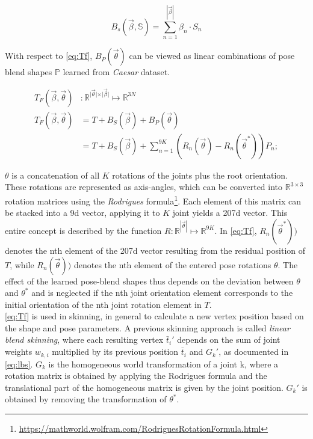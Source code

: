 \begin{equation}
\label{eq:bs}
B_{s}(\vec{\beta},\mathbb{S}) = \sum_{n=1}^{|\vec{\beta}|}\beta_{n} \cdot S_{n}
\end{equation}

With respect to \autoref{eq:Tf}, $B_{P}(\vec{\theta})$ can be viewed as linear combinations of pose blend shapes $\mathbb{P}$ learned from \emph{Caesar} dataset.

\begin{equation}
\label{eq:Tf}
	\begin{split}
		T_{F}(\vec{\beta},\vec{\theta})&: \mathbb{R}^{\vert \vec{\theta} 			\vert \times \vert \vec{\beta} \vert} \mapsto \mathbb{R}^{3N} \\
		T_{F}(\vec{\beta},\vec{\theta}) &= T + B_{S}(\vec{\beta}) + B_{P}				(\vec{\theta}) \\
		&= T + B_{S}(\vec{\beta}) + \sum_{n=1}^{9K} (R_{n}(\vec{\theta}) - 				R_{n}(\vec{\theta}^{*}))P_{n};
	\end{split}
\end{equation}

$\theta$ is a concatenation of all $K$ rotations of the joints plus the root orientation. These rotations are represented as axis-angles, which can be converted into $\mathbb{R}^{3\times3}$ rotation matrices using the \emph{Rodrigues} formula\footnote{\url{https://mathworld.wolfram.com/RodriguesRotationFormula.html}}. Each element of this matrix can be stacked into a 9d vector, applying it to $K$ joint yields a 207d vector. This entire concept is described by the function 
$R: \mathbb{R}^{|\vec{\theta}|} \mapsto \mathbb{R}^{9K}$. In \autoref{eq:Tf}, $R_{n}(\vec{\theta}^{*}))$ denotes the nth element of the 207d vector resulting from the residual position of $T$, while $R_{n}(\vec{\theta}))$ denotes the nth element of the entered pose rotations $\theta$. The effect of the learned pose-blend shapes thus depends on the deviation between $\theta$ and $\theta^{*}$ and is neglected if the nth joint orientation element corresponds to the initial orientation of the nth joint rotation element in $T$. \\

\autoref{eq:Tf} is used in skinning, in general to calculate a new vertex position based on the shape and pose parameters. A previous skinning approach is called \emph{linear blend skinning}, where each resulting vertex $\bar{t}_{i}'$ depends on the sum of joint weights $w_{k,i}$ multiplied by its previous position $\bar{t}_{i}$ and $G_{k}'$, as documented in \autoref{eq:lbs}. $G_{k}$ is the homogeneous world transformation of a joint k, where a rotation matrix is obtained by applying the Rodrigues formula and the translational part of the homogeneous matrix is given by the joint position. $G_{k}'$ is obtained by removing the transformation of $\theta^{*}$.  

